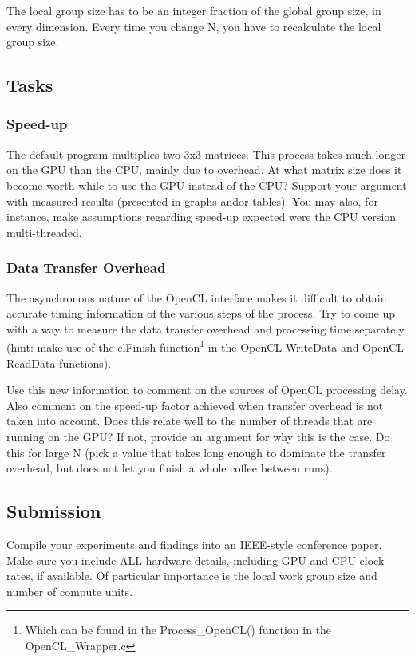 The local group size has to be an integer fraction of the global group size, in every dimension. Every time you change N, you have to recalculate the local group size. 

\subsection{Tasks}
\subsubsection{Speed-up}
The default program multiplies two 3x3 matrices. This process takes much longer on the GPU than the CPU, mainly due to overhead. At what matrix size does it become worth while to use the GPU instead of the CPU? Support your argument with measured results (presented in graphs and\/or tables). You may also, for instance, make assumptions regarding speed-up expected were the CPU version multi-threaded.

\subsubsection{Data Transfer Overhead}
The asynchronous nature of the OpenCL interface makes it difficult to obtain accurate timing information of the various steps of the process. Try to come up with a way to measure the data transfer overhead and processing time separately (hint: make use of the clFinish function\footnote{Which can be found in the Process\_OpenCL() function in the OpenCL\_Wrapper.c} in the OpenCL WriteData and OpenCL ReadData functions).

Use this new information to comment on the sources of OpenCL processing delay. Also comment on the speed-up factor achieved when transfer overhead is not taken into account. Does this relate well to the number of threads that are running on the GPU? If not, provide an argument for why this is the case. Do this for large N (pick a value that takes long enough to dominate the transfer overhead, but does not let you finish a whole coffee between runs).

\subsection{Submission}
Compile your experiments and findings into an IEEE-style conference paper. Make sure you include ALL hardware details, including GPU and CPU clock rates, if available. Of particular importance is the local work group size and number of compute units.

